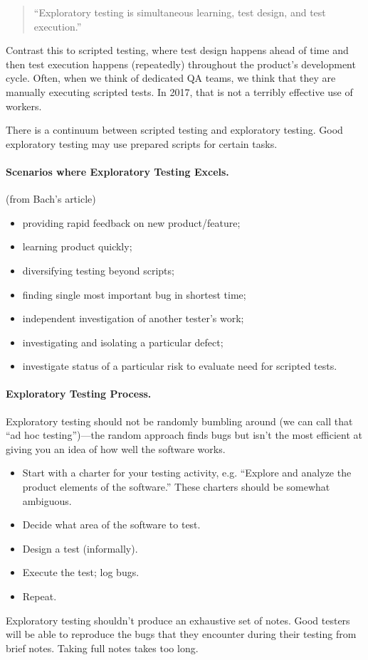 \documentclass[11pt]{article}
\begin{document}
\begin{quote}
``Exploratory testing is simultaneous learning, test design, and test execution.''
\end{quote}
Contrast this to scripted testing, where test design
happens ahead of time and then test execution happens (repeatedly)
throughout the product's development cycle. Often, when we think of
dedicated QA teams, we think that they are manually executing scripted
tests. In 2017, that is not a terribly effective use of workers.

There is a continuum between scripted testing and exploratory testing.
Good exploratory testing may use prepared scripts for certain tasks.

\newpage
\paragraph{Scenarios where Exploratory Testing Excels.} (from Bach's article)
\begin{itemize}[noitemsep]
\item providing rapid feedback on new product/feature;
\item learning product quickly;
\item diversifying testing beyond scripts;
\item finding single most important bug in shortest time;
\item independent investigation of another tester's work;
\item investigating and isolating a particular defect;
\item investigate status of a particular risk to evaluate need for scripted tests.
\end{itemize}

\paragraph{Exploratory Testing Process.} Exploratory testing should not be
randomly bumbling around (we can call that ``ad hoc testing'')---the random
approach finds bugs but isn't the most efficient at giving you an idea of how well
the software works.

\begin{itemize}[noitemsep]
\item Start with a charter for your testing activity, e.g. ``Explore and analyze the product elements of the software.'' 
These charters should be somewhat ambiguous.
\item Decide what area of the software to test.
\item Design a test (informally).
\item Execute the test; log bugs.
\item Repeat.
\end{itemize}
Exploratory testing shouldn't produce an exhaustive set of notes. Good testers will
be able to reproduce the bugs that they encounter during their testing from brief notes.
Taking full notes takes too long.
\end{document}
